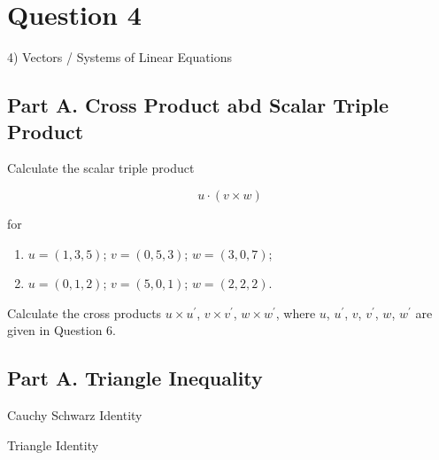\documentclass[12pt,a4paper]{article}
\begin{document}
	\section*{Question 4}
	4) Vectors / Systems of Linear Equations
	




	
	\subsection*{Part A. Cross Product abd Scalar Triple Product}
 Calculate the scalar triple product
	
	\[u\cdot (v\times w)\]
	
	for
	
	\begin{enumerate}
		\item $u=(1,3,5)$; $v=(0,5,3)$; $w=(3,0,7)$;
		
		\item $u=(0,1,2)$; $v=(5,0,1)$; $w=(2,2,2).$
	\end{enumerate}


 
 \vspace{0.25cm}Calculate the cross products $u\times
 u^{\prime}$, $v\times v^{\prime}$, $w\times w^{\prime}$, where
 $u$, $u^{\prime}$, $v$, $v^{\prime}$, $w$, $w^{\prime}$ are given
 in  Question $6$.
 	
\subsection*{Part A. Triangle Inequality}

Cauchy Schwarz Identity

Triangle Identity
\end{document}
